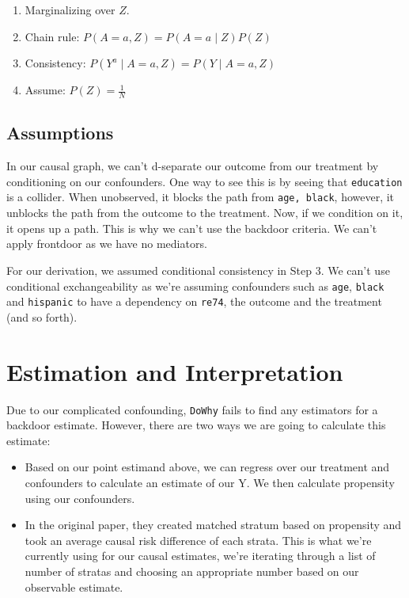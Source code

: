 \documentclass[12pt]{article}
\begin{document}
\begin{enumerate}[itemsep=-0.25em,label={\arabic*.}]
\item Marginalizing over $Z$.
\item Chain rule: $P(A=a, Z) = P(A=a \mid Z) P(Z)$
\item Consistency: $P(Y^a \mid A=a, Z) = P(Y \mid A=a, Z)$
\item Assume: $P(Z) = \frac{1}{N}$
\end{enumerate}


\subsection{Assumptions}

In our causal graph, we can't d-separate our outcome from our treatment by conditioning on our confounders. One way to see this is by seeing that {\tt education} is a collider. When unobserved, it blocks the path from {\tt age, black}, however, it unblocks the path from the outcome to the treatment. Now, if we condition on it, it opens up a path. This is why we can't use the backdoor criteria. We can't apply frontdoor as we have no mediators.

For our derivation, we assumed conditional consistency in Step 3. We can't use conditional exchangeability as we're assuming confounders such as {\tt age}, {\tt black} and {\tt hispanic} to have a dependency on {\tt re74}, the outcome and the treatment (and so forth).

\section{Estimation and Interpretation} \label{sec:estimation}

Due to our complicated confounding, {\tt DoWhy} fails to find any estimators for a backdoor estimate. However, there are two ways we are going to calculate this estimate:

\begin{itemize}[itemsep=-0.25em]
\item{Based on our point estimand above, we can regress over our treatment and confounders to calculate an estimate of our Y. We then calculate propensity using our confounders.}
\item{In the original paper, they created matched stratum based on propensity and took an average causal risk difference of each strata. This is what we're currently using for our causal estimates, we're iterating through a list of number of stratas and choosing an appropriate number based on our observable estimate.}
\end{itemize}
\end{document}
